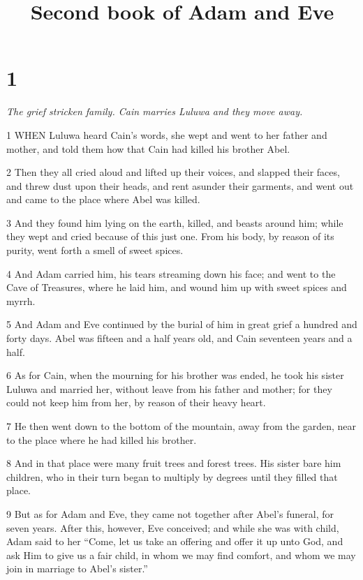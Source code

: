 

\title{Second book of Adam and Eve}

\chapter{1}

\par \textit{The grief stricken family. Cain marries Luluwa and they move away.}

\par 1 WHEN Luluwa heard Cain's words, she wept and went to her father and mother, and told them how that Cain had killed his brother Abel.

\par 2 Then they all cried aloud and lifted up their voices, and slapped their faces, and threw dust upon their heads, and rent asunder their garments, and went out and came to the place where Abel was killed.

\par 3 And they found him lying on the earth, killed, and beasts around him; while they wept and cried because of this just one. From his body, by reason of its purity, went forth a smell of sweet spices.

\par 4 And Adam carried him, his tears streaming down his face; and went to the Cave of Treasures, where he laid him, and wound him up with sweet spices and myrrh.

\par 5 And Adam and Eve continued by the burial of him in great grief a hundred and forty days. Abel was fifteen and a half years old, and Cain seventeen years and a half.

\par 6 As for Cain, when the mourning for his brother was ended, he took his sister Luluwa and married her, without leave from his father and mother; for they could not keep him from her, by reason of their heavy heart.

\par 7 He then went down to the bottom of the mountain, away from the garden, near to the place where he had killed his brother.

\par 8 And in that place were many fruit trees and forest trees. His sister bare him children, who in their turn began to multiply by degrees until they filled that place.

\par 9 But as for Adam and Eve, they came not together after Abel's funeral, for seven years. After this, however, Eve conceived; and while she was with child, Adam said to her “Come, let us take an offering and offer it up unto God, and ask Him to give us a fair child, in whom we may find comfort, and whom we may join in marriage to Abel's sister.”

